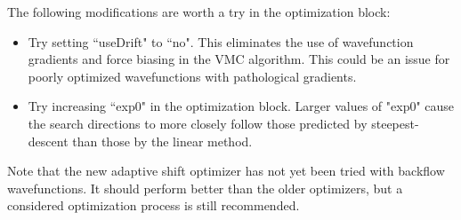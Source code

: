 The following modifications are worth a try in the optimization block:

\begin{itemize}
\item Try setting ``useDrift" to ``no".  This eliminates the use of wavefunction gradients and force biasing in the VMC algorithm.  This could be an issue for poorly optimized wavefunctions with pathological gradients.  
\item Try increasing ``exp0" in the optimization block.  Larger values of "exp0" cause the search directions to more closely follow those predicted by steepest-descent than those by the linear method.
\end{itemize}

Note that the new adaptive shift optimizer has not yet been tried with backflow wavefunctions. It should perform better than the older optimizers, but a considered optimization process is still recommended.


